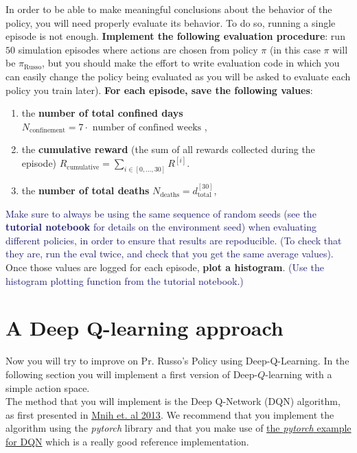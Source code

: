 \documentclass[10pt]{article}
\begin{document}
In order to be able to make meaningful conclusions about the behavior of the policy, you will need properly evaluate its behavior.
To do so, running a single episode is not enough. \textbf{Implement the following evaluation procedure}: run $50$ simulation episodes where actions are chosen from policy $\pi$ (in this case $\pi$ will be $\pi_\text{Russo}$, but you should make the effort to write evaluation code in which you can easily change the policy being evaluated as you will be asked to evaluate each policy you train later). \textbf{For each episode, save the following values}:
\begin{enumerate}
  \item the \textbf{number of total confined days} $N_\text{confinement}=7\cdot \text{ number of confined weeks }$,
  \item the \textbf{cumulative reward} (the sum of all rewards collected during the episode) $R_\text{cumulative} = \sum_{i \in [0 , ..., 30]} R^{[i]}$.
  \item the \textbf{number of total deaths} $N_\text{deaths} = d_\text{total}^{[30]}$,
\end{enumerate}
\textcolor{MidnightBlue}{Make sure to always be using the same sequence of random seeds (see the \textbf{tutorial notebook} for details on the environment seed) when evaluating different policies, in order to ensure that results are repoducible. (To check that they are, run the eval twice, and check that you get the same average values).} Once those values are logged for each episode, \textbf{plot a histogram}. \textcolor{MidnightBlue}{(Use the histogram plotting function from the tutorial notebook.)}
  
\section{A Deep Q-learning approach}

Now you will try to improve on Pr. Russo's Policy using Deep-Q-Learning. In the following section you will implement a first version of Deep-$Q$-learning with a simple action space.\\

The method that you will implement is the Deep Q-Network (DQN) algorithm, as first presented in \href{https://arxiv.org/pdf/1312.5602.pdf}{Mnih et. al 2013}. We recommend that you implement the algorithm using the \textit{pytorch} library and that you make use of \href{https://pytorch.org/tutorials/intermediate/reinforcement_q_learning.html}{the \textit{pytorch} example for DQN} which is a really good reference implementation. \\
\end{document}
